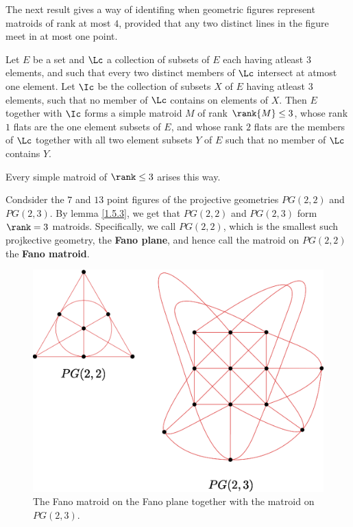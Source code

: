 The next result gives a way of identifing when geometric figures represent
matroids of rank at most $4$, provided that any two distinct lines in the
figure meet in at most one point.

\begin{lemma}\label{1.5.4}
    Let $E$ be a set and $\Lc$ a collection of subsets of $E$ each having
    atleast $3$ elements, and such that every two distinct members of $\Lc$
    intersect at atmost one element. Let  $\Ic$ be the collection of subsets $X$
    of  $E$ having atleast  $3$ elements, such that no member of  $\Lc$ contains
    on elements of  $X$. Then $E$ together with $\Ic$ forms a simple matroid $M$
    of rank  $\rank{M} \leq 3$, whose rank $1$ flats are the one element subsets
    of  $E$, and whose rank $2$ flats are the members of $\Lc$ together with all
    two element subsets $Y$ of $E$ such that no member of $\Lc$ contains $Y$.
\end{lemma}
\begin{corollary}
    Every simple matroid of $\rank \leq 3$ arises this way.
\end{corollary}

\begin{example}\label{1.19}
    Condsider the $7$ and  $13$ point figures of the projective geometries
    $PG(2,2)$ and $PG(2,3)$. By lemma \ref{1.5.3}, we get that $PG(2,2)$ and
    $PG(2,3)$ form $\rank=3$  matroids. Specifically, we call $PG(2,2)$, which is
    the smallest such projkective geometry, the \textbf{Fano plane}, and hence
    call the matroid on $PG(2,2)$ the \textbf{Fano matroid}.
    \begin{figure}[h]
        \centering
        \includegraphics[scale=0.7]{Figures/chapter1/pg(2,2)_pg(2,3).eps}
        \caption{The Fano matroid on the Fano plane together with the matroid on
        $PG(2,3)$.}
        \label{fig_1.14}
    \end{figure}
\end{example}

